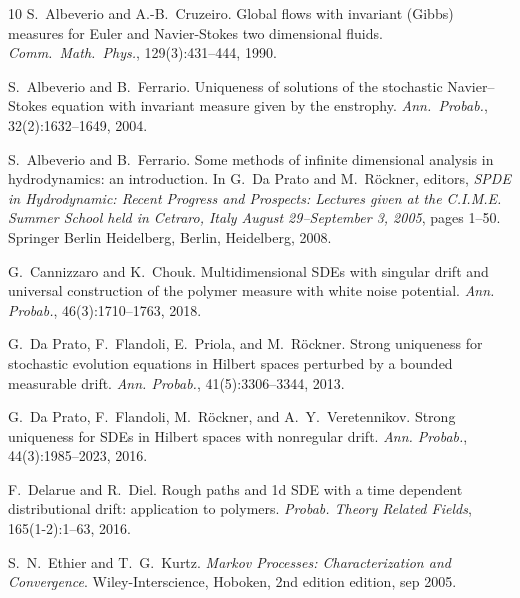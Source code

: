 \documentclass{article}
\newcommand{\tmtextit}[1]{{\itshape{#1}}}
\begin{document}
\begin{thebibliography}{10}
  S.~Albeverio  and  A.-B.~Cruzeiro.
  {\newblock}Global flows with invariant (Gibbs) measures for Euler and
  Navier-Stokes two dimensional fluids.
  {\newblock}\tmtextit{Comm.~Math.~Phys.}, 129(3):431--444, 1990.{\newblock}
  
  S.~Albeverio  and  B.~Ferrario.
  {\newblock}Uniqueness of solutions of the stochastic Navier--Stokes equation
  with invariant measure given by the enstrophy.
  {\newblock}\tmtextit{Ann.~Probab.}, 32(2):1632--1649, 2004.{\newblock}
  
  S.~Albeverio  and  B.~Ferrario.
  {\newblock}Some methods of infinite dimensional analysis in hydrodynamics:
  an introduction. {\newblock}In  G.~Da Prato  and  M.~R{\"o}ckner, editors,
  \tmtextit{SPDE in Hydrodynamic: Recent Progress and Prospects: Lectures
  given at the C.I.M.E. Summer School held in Cetraro, Italy August
  29--September 3, 2005},  pages  1--50. Springer Berlin Heidelberg, Berlin,
  Heidelberg, 2008.{\newblock}
  
  G.~Cannizzaro  and  K.~Chouk.
  {\newblock}Multidimensional SDEs with singular drift and universal
  construction of the polymer measure with white noise potential.
  {\newblock}\tmtextit{Ann. Probab.}, 46(3):1710--1763, 2018.{\newblock}
  
  G.~Da Prato, F.~Flandoli, E.~Priola, and 
  M.~R{\"o}ckner. {\newblock}Strong uniqueness for stochastic evolution
  equations in Hilbert spaces perturbed by a bounded measurable drift.
  {\newblock}\tmtextit{Ann. Probab.}, 41(5):3306--3344, 2013.{\newblock}
  
  G.~Da Prato, F.~Flandoli, M.~R{\"o}ckner, and 
  A.~Y.~Veretennikov. {\newblock}Strong uniqueness for SDEs in Hilbert spaces
  with nonregular drift. {\newblock}\tmtextit{Ann. Probab.}, 44(3):1985--2023,
  2016.{\newblock}
  
  F.~Delarue  and  R.~Diel. {\newblock}Rough paths and
  1d SDE with a time dependent distributional drift: application to polymers.
  {\newblock}\tmtextit{Probab. Theory Related Fields}, 165(1-2):1--63,
  2016.{\newblock}
  
  S.~N.~Ethier  and  T.~G.~Kurtz.
  {\newblock}\tmtextit{Markov Processes: Characterization and Convergence}.
  {\newblock}Wiley-Interscience, Hoboken, 2nd edition  edition, sep
  2005.{\newblock}
  

\end{thebibliography}
\end{document}
